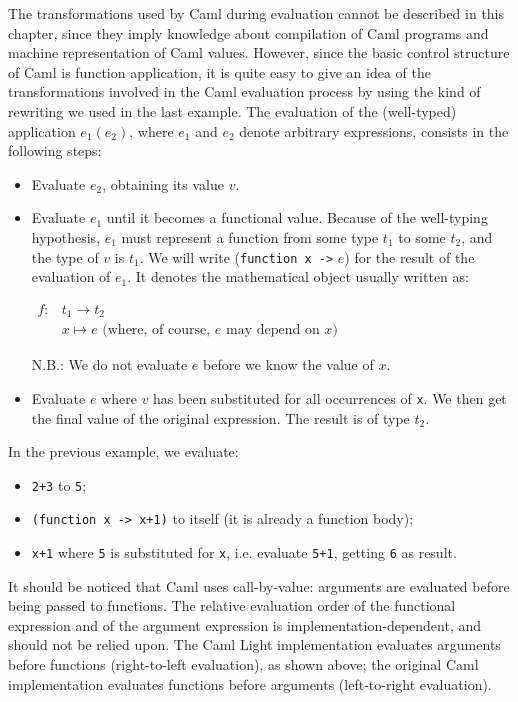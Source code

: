 The transformations used by Caml during evaluation
cannot be described in this chapter, since
they imply knowledge about compilation of Caml programs and machine
representation of Caml values. However, since the basic control structure
of Caml is function application, it is quite easy to give an idea of
the transformations involved in the Caml evaluation process by using the
kind of rewriting we used in the last example.
The evaluation of the (well-typed) application $e_1 (e_2)$, where $e_1$
and $e_2$ denote arbitrary expressions, consists in the following
steps:
\begin{itemize}
\item Evaluate $e_2$, obtaining its value $v$.
\item
 Evaluate $e_1$ until it becomes a functional value. Because of the well-typing
 hypothesis, $e_1$ must represent a function from some type $t_1$ to some
$t_2$, and the type of $v$ is $t_1$.
We will write ({\tt function x ->} $e$) for the result of the evaluation
 of $e_1$. It denotes the mathematical object usually written as:
 \begin{center}
 $\begin{array}{ll}
  f:& t_1 \rightarrow t_2\\
    & x \mapsto e \mbox{ (where, of course, $e$ may depend on $x$)}
  \end{array}$
 \end{center}
N.B.: We do not evaluate $e$ before we know the value of $x$.
\item Evaluate $e$ where $v$ has been substituted for all occurrences of
\verb|x|. We then get the final value of the original expression. The result
is of type $t_2$.
\end{itemize}
%
In the previous example, we evaluate:
\begin{itemize}
\item \verb|2+3| to \verb|5|;
\item \verb|(function x -> x+1)| to itself (it is already a function body);
\item \verb|x+1| where \verb|5| is substituted for \verb|x|, i.e. evaluate
\verb|5+1|, getting \verb|6| as result.
\end{itemize}
%
It should be noticed that Caml uses call-by-value: arguments are
evaluated before being passed to functions. The relative evaluation
order of the functional expression and of the argument expression is
implementation-dependent, and should not be relied upon. The Caml
Light implementation evaluates arguments before functions
(right-to-left evaluation), as shown above; the original Caml
implementation evaluates functions before arguments (left-to-right evaluation).



